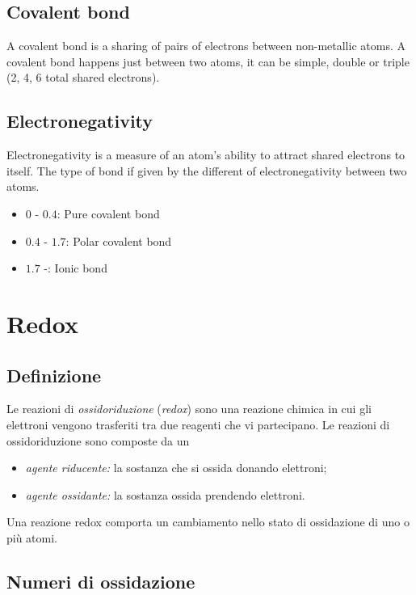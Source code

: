 \documentclass[a4paper]{article}
\begin{document}
\subsection{Covalent bond}

A covalent bond is a sharing of pairs of electrons between non-metallic atoms.
A covalent bond happens just between two atoms, it can be simple, double or triple (2, 4, 6 total shared electrons).

\subsection{Electronegativity}

Electronegativity is a measure of an atom's ability to attract shared electrons to itself.
The type of bond if given by the different of electronegativity between two atoms.
\begin{itemize}
    \item \(0\) - \(0.4\): Pure covalent bond
    \item \(0.4\) - \(1.7\): Polar covalent bond
    \item \(1.7\) -: Ionic bond
\end{itemize}

\pagebreak

\section{Redox}

\subsection{Definizione}

 {
    Le reazioni di \textit{ossidoriduzione} (\textit{redox}) sono una reazione chimica in cui gli elettroni
    vengono trasferiti tra due reagenti che vi partecipano.
    Le reazioni di ossidoriduzione sono composte da un
    \begin{itemize}
        \item \textit{agente riducente:} la sostanza che si ossida donando elettroni;
        \item \textit{agente ossidante:} la sostanza ossida prendendo elettroni.
    \end{itemize}
}

Una reazione redox comporta un cambiamento nello stato di ossidazione di uno o più atomi.

\subsection{Numeri di ossidazione}
\end{document}
